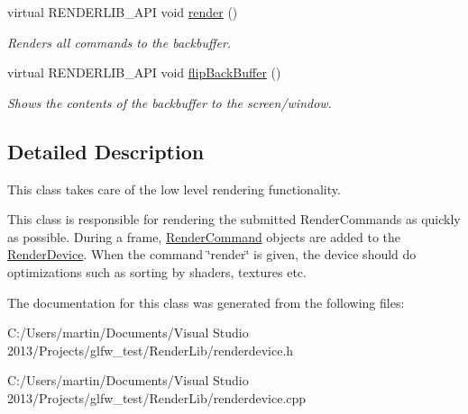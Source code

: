 \begin{DoxyCompactItemize}
\mbox{\label{class_render_device_ac31e81d0f1bc80cefbb3e1508969b762}} 
virtual R\+E\+N\+D\+E\+R\+L\+I\+B\+\_\+\+A\+PI void \hyperlink{class_render_device_ac31e81d0f1bc80cefbb3e1508969b762}{render} ()
\begin{DoxyCompactList}\small\item\em Renders all commands to the backbuffer. \end{DoxyCompactList}\item 
\mbox{\label{class_render_device_a62378cceca53ade7c57792c3bc12ef62}} 
virtual R\+E\+N\+D\+E\+R\+L\+I\+B\+\_\+\+A\+PI void \hyperlink{class_render_device_a62378cceca53ade7c57792c3bc12ef62}{flip\+Back\+Buffer} ()
\begin{DoxyCompactList}\small\item\em Shows the contents of the backbuffer to the screen/window. \end{DoxyCompactList}\end{DoxyCompactItemize}


\subsection{Detailed Description}
This class takes care of the low level rendering functionality. 

This class is responsible for rendering the submitted Render\+Commands as quickly as possible. During a frame, \hyperlink{class_render_command}{Render\+Command} objects are added to the \hyperlink{class_render_device}{Render\+Device}. When the command \char`\"{}render\char`\"{} is given, the device should do optimizations such as sorting by shaders, textures etc. 

The documentation for this class was generated from the following files\+:\begin{DoxyCompactItemize}
\item 
C\+:/\+Users/martin/\+Documents/\+Visual Studio 2013/\+Projects/glfw\+\_\+test/\+Render\+Lib/renderdevice.\+h\item 
C\+:/\+Users/martin/\+Documents/\+Visual Studio 2013/\+Projects/glfw\+\_\+test/\+Render\+Lib/renderdevice.\+cpp\end{DoxyCompactItemize}
